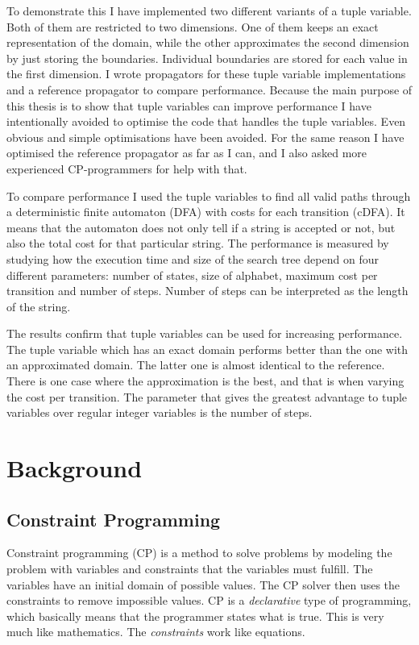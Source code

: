 \documentclass[a4paper,11pt]{article}
\begin{document}
To demonstrate this I have implemented two different variants of a tuple variable. Both of them are restricted to two dimensions. One of them keeps an exact representation of the domain, while the other approximates the second dimension by just storing the boundaries. Individual boundaries are stored for each value in the first dimension. I wrote propagators for these tuple variable implementations and a reference propagator to compare performance. Because the main purpose of this thesis is to show that tuple variables can improve performance I have intentionally avoided to optimise the code that handles the tuple variables. Even obvious and simple optimisations have been avoided. For the same reason I have optimised the reference propagator as far as I can, and I also asked more experienced CP-programmers for help with that.

To compare performance I used the tuple variables to find all valid paths through a deterministic finite automaton (DFA) with costs for each transition (cDFA). It means that the automaton does not only tell if a string is accepted or not, but also the total cost for that particular string. The performance is measured by studying how the execution time and size of the search tree depend on four different parameters: number of states, size of alphabet, maximum cost per transition and number of steps. Number of steps can be interpreted as the length of the string.

The results confirm that tuple variables can be used for increasing performance. The tuple variable which has an exact domain performs better than the one with an approximated domain. The latter one is almost identical to the reference. There is one case where the approximation is the best, and that is when varying the cost per transition. The parameter that gives the greatest advantage to tuple variables over regular integer variables is the number of steps.



\section{Background}
\subsection{Constraint Programming}

Constraint programming (CP) is a method to solve problems by modeling the problem with variables and constraints that the variables must fulfill. The variables have an initial domain of possible values. The CP solver then uses the constraints to remove impossible values. CP is a \textit{declarative} type of programming, which basically means that the programmer states what is true. This is very much like mathematics. The \textit{constraints} work like equations.
\end{document}
